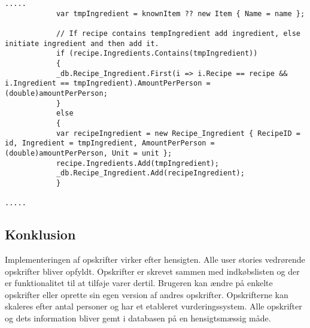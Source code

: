 \begin{lstlisting}[caption="Udklip fra AddIngredient som opretter og tilføjer ingredienser til en specifik opskrift - Her er vist hvad der er forskel fra AddItem i ShoppingListsController"]
.....
            var tmpIngredient = knownItem ?? new Item { Name = name };
            
            // If recipe contains tempIngredient add ingredient, else initiate ingredient and then add it.
            if (recipe.Ingredients.Contains(tmpIngredient))
            {
            _db.Recipe_Ingredient.First(i => i.Recipe == recipe && i.Ingredient == tmpIngredient).AmountPerPerson = (double)amountPerPerson;
            }
            else
            {
            var recipeIngredient = new Recipe_Ingredient { RecipeID = id, Ingredient = tmpIngredient, AmountPerPerson = (double)amountPerPerson, Unit = unit };
            recipe.Ingredients.Add(tmpIngredient);
            _db.Recipe_Ingredient.Add(recipeIngredient);
            }
            
.....
\end{lstlisting}


\subsection{Konklusion}
Implementeringen af opskrifter virker efter hensigten. 
Alle user stories vedrørende opskrifter bliver opfyldt. 
Opskrifter er skrevet sammen med indkøbslisten og der er funktionalitet til at tilføje varer dertil. Brugeren kan ændre på enkelte opskrifter eller oprette sin egen version af andres opskrifter. 
Opskrifterne kan skaleres efter antal personer og har et etableret vurderingssystem. 
Alle opskrifter og dets information bliver gemt i databasen på en hensigtsmæssig måde.

